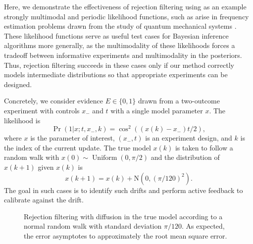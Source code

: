 \documentclass[twoside]{article}
\newcommand{\NN}{\mathrm{N}}
\begin{document}
Here, we demonstrate the effectiveness of rejection filtering using as an
example strongly multimodal and periodic likelihood functions, such as arise
in frequency estimation problems drawn from the study of quantum mechanical
systems \cite{ferrie_how_2013,wiebe_efficient_2015}. These likelihood functions serve as useful test cases for
Bayesian inference algorithms more generally, as the multimodality of these
likelihoods forces a tradeoff between informative experiments and
multimodality in the posteriors. Thus, rejection filtering succeeds in these cases only
if our method correctly models intermediate distributions so that appropriate
experiments can be designed.

Concretely, we consider evidence $E\in\{0, 1\}$ drawn from a two-outcome
experiment with controls $x_-$ and $t$ with a single model parameter $x$.
The likelihood is
\begin{equation}
  \label{eq:inv-model}
 \Pr(1 | x; t, x_-,k) = \cos^2((x(k) - x_-) t / 2),
\end{equation}
where $x$ is the parameter of interest, $(x_-, t)$ is an experiment design,
and $k$ is the index of the current update.  The true model $x(k)$ is taken to
follow a random walk with $x(0)\sim \operatorname{Uniform}(0,\pi/2)$ and the distribution
of $x(k+1)$ given $x(k)$ is
\begin{equation}
    x(k+1)=x(k) + \NN(0,(\pi/120)^2).
\end{equation}
The goal in such cases is to identify such drifts and perform active feedback to calibrate
against the drift.

\begin{figure}
    \caption{
        \label{fig:crej-diffusion}
        Rejection filtering with diffusion in the true model according to
        a normal random walk with standard deviation $\pi / 120$.  As expected, the error asymptotes to approximately the root mean square error.
    }
\end{figure}
\end{document}
